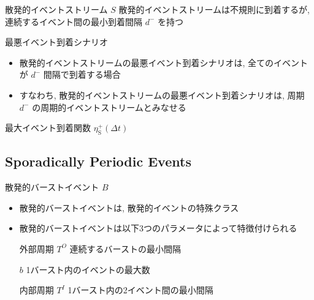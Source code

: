 \begin{frame}{散発的イベントストリーム $S$}
    散発的イベントストリームは不規則に到着するが, 連続するイベント間の最小到着間隔 $d^{-}$ を持つ
\end{frame}

\begin{frame}{最悪イベント到着シナリオ}
    \begin{itemize}
        \item 散発的イベントストリームの最悪イベント到着シナリオは, 全てのイベントが $d^{-}$ 間隔で到着する場合
        \item すなわち, 散発的イベントストリームの最悪イベント到着シナリオは, 周期 $d^{-}$ の周期的イベントストリームとみなせる
    \end{itemize}
\end{frame}

\begin{frame}{最大イベント到着関数 $\eta_{\mathrm{S}}^{+}(\Delta t)$}
\end{frame}


\subsection{Sporadically Periodic Events}
\label{ssec: sporadically periodic events}

\begin{frame}{散発的バーストイベント $B$}
    \begin{itemize}
        \item 散発的バーストイベントは, 散発的イベントの特殊クラス
        \item 散発的バーストイベントは以下3つのパラメータによって特徴付けられる
              \begin{block}{外部周期 $T^{O}$}
                  連続するバーストの最小間隔
              \end{block}
              \begin{block}{$b$}
                  1バースト内のイベントの最大数
              \end{block}
              \begin{block}{内部周期 $T^{I}$}
                  1バースト内の2イベント間の最小間隔
              \end{block}
    \end{itemize}
\end{frame}

